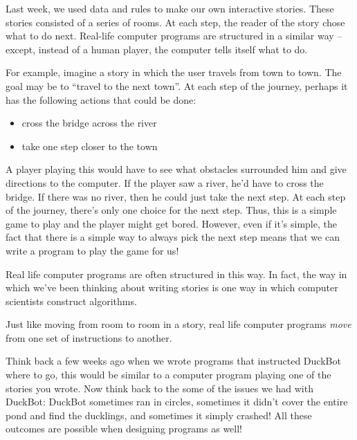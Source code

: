 
Last week, we used data and rules to make our own interactive stories. These stories consisted of
a series of rooms. At each step, the reader of the story chose what to do next. Real-life computer
programs are structured in a similar way -- except, instead of a human player, the computer tells
itself what to do.

For example, imagine a story in which the user travels from town to town. The goal may be to
``travel to the next town''. At each step of the journey, perhaps it has the following actions that
could be done:

\begin{itemize}
    \item cross the bridge across the river
    \item take one step closer to the town
\end{itemize}

A player playing this would have to see what obstacles surrounded him and give directions to the
computer. If the player saw a river, he'd have to cross the bridge. If there was no river, then he
could just take the next step. At each step of the journey, there's only one choice for the next
step. Thus, this is a simple game to play and the player might get bored. However, even if it's
simple, the fact that there is a simple way to always pick the next step means that we can write a
program to play the game for us!

Real life computer programs are often structured in this way. In fact, the way in which we've been
thinking about writing stories is one way in which computer scientists construct algorithms.

Just like moving from room to room in a story, real life computer programs \emph{move} from one set
of instructions to another.

Think back a few weeks ago when we wrote programs that instructed DuckBot where to go, this would be
similar to a computer program playing one of the stories you wrote. Now think back to the some of
the issues we had with DuckBot: DuckBot sometimes ran in circles, sometimes it didn't cover the
entire pond and find the ducklings, and sometimes it simply crashed! All these outcomes are possible
when designing programs as well!

